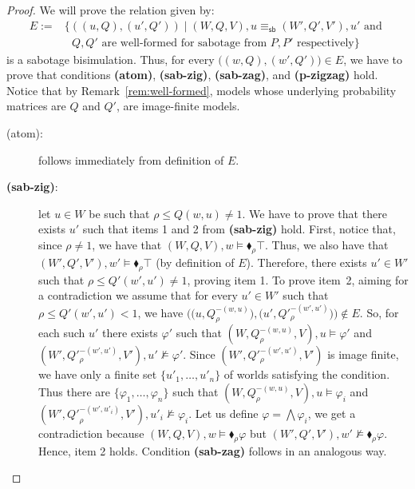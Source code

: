\begin{proof}
We will prove the relation given by:
\begin{align*}
    E := & \{ ((u,{Q}),(u',{Q}')) \mid  (W,{Q},V), u \equiv_{\mathsf{sb}} (W',{Q}',V') , u' \text{ and } \\
    & \text{ ${Q},{Q'}$ are well-formed for sabotage from $P,P'$ respectively} \} 
\end{align*}
is a sabotage bisimulation. Thus, for every $\big((w,{Q}) ,(w',{Q}')\big)\in E$, we have to prove that conditions \textbf{(atom)}, \textbf{(sab-zig)}, \textbf{(sab-zag)}, and \textbf{(p-zigzag)} hold. Notice that by Remark~\ref{rem:well-formed}, models whose underlying probability matrices are ${Q}$ and ${Q}'$, are image-finite models.

\begin{description}
    \item[(atom):] follows immediately from definition of $E$. 

    \item[\textbf{(sab-zig)}:] let $u \in W$ be such that $\rho \leq {Q}(w,u) \neq 1$. We have to prove that there exists $u'$ such that items 1 and 2 from \textbf{(sab-zig)} hold. First, notice that, since $\rho \neq 1 $, we have that $(W,{Q},V), w \models \blacklozenge_{\rho} \top$. Thus, we also have that $(W',{Q}',V'), w' \models \blacklozenge_{\rho} \top$ (by definition of $E$). Therefore, there exists $u' \in W'$ such that $\rho \leq {Q}'(w',u') \neq 1$, proving item 1. To prove item~2, aiming for a contradiction we assume that for every $u' \in W'$ such that $ \rho \leq {Q}'(w', u') < 1$,  we have $\big(\big(u, {Q}_{\rho}^{-(w,u)}\big), \big(u', {Q}'^{-(w',u')}_{\rho}\big)\big) \notin E$. So, for each such $u'$ there exists $\varphi'$ such that $(W,{Q}^{-(w,u)}_{\rho},V),u\models \varphi'$ and $(W',{Q}'^{-(w',u')}_{\rho},V'),u'\not\models \varphi'$. Since $(W',{Q}'^{-(w',u')}_{\rho},V')$ is image finite, we have only a finite set $\{u'_1,\dots,u'_n\}$ of worlds satisfying the condition. Thus there are $\{ \varphi_1,\dots,\varphi_n \}$ such that $(W,{Q}^{-(w,u)}_{\rho},V),u\models \varphi_i$ and $(W',{Q'}_{\rho}^{-(w',u'_i)},V'),u'_i\not\models \varphi_i$. Let us define $\varphi = \bigwedge \varphi_i$, we get a contradiction because $(W,{Q},V), w \models \blacklozenge_{\rho} \varphi$ but $(W',{Q}',V'), w' \not\models \blacklozenge_{\rho} \varphi$. Hence, item 2 holds. Condition \textbf{(sab-zag)} follows in an analogous way.


\end{description}
\end{proof}
